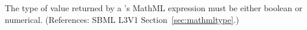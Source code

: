 The type of value returned by a \FunctionDefinition's  MathML
expression must be either boolean or numerical.  (References: SBML L3V1
Section~\ref{sec:mathmltype}.)
